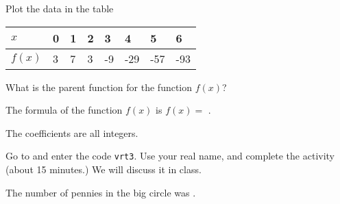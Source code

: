 \documentclass{ximera}
\begin{document}
\begin{question}
Plot the data in the table
\begin{center}
\begin{tabular}{llllllll}
    $x$  & 0 & 1 & 2 & 3  & 4   & 5    & 6   \\ \hline
    $f(x)$ & 3 & 7 & 3 & -9 & -29 & -57 & -93 \\
\end{tabular}
\end{center} 
What is the parent function for the function $f(x)$?
\begin{solution}
\begin{multiple-choice}
\end{multiple-choice}
The formula of the function $f(x)$ is $f(x)=$ .
\begin{hint}
The coefficients are all integers.
\end{hint}
\end{solution}

\end{question}




\begin{question}
Go to  and enter the code \verb|vrt3|. Use your real name, and complete the activity (about 15 minutes.) We will discuss it in class.
\begin{solution}
The number of pennies in the big circle was .
\end{solution}
\end{question}
\end{document}
